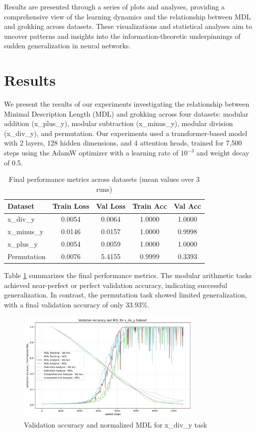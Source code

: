 \documentclass{article} %
\begin{document}
Results are presented through a series of plots and analyses, providing a comprehensive view of the learning dynamics and the relationship between MDL and grokking across datasets. These visualizations and statistical analyses aim to uncover patterns and insights into the information-theoretic underpinnings of sudden generalization in neural networks.

\section{Results}
\label{sec:results}

We present the results of our experiments investigating the relationship between Minimal Description Length (MDL) and grokking across four datasets: modular addition (x\_plus\_y), modular subtraction (x\_minus\_y), modular division (x\_div\_y), and permutation. Our experiments used a transformer-based model with 2 layers, 128 hidden dimensions, and 4 attention heads, trained for 7,500 steps using the AdamW optimizer \cite{loshchilov2017adamw} with a learning rate of $10^{-3}$ and weight decay of 0.5.

\begin{table}[h]
\centering
\caption{Final performance metrics across datasets (mean values over 3 runs)}
\label{tab:final_performance}
\begin{tabular}{lcccc}
\toprule
Dataset & Train Loss & Val Loss & Train Acc & Val Acc \\
\midrule
x\_div\_y & 0.0054 & 0.0064 & 1.0000 & 1.0000 \\
x\_minus\_y & 0.0146 & 0.0157 & 1.0000 & 0.9998 \\
x\_plus\_y & 0.0054 & 0.0059 & 1.0000 & 1.0000 \\
Permutation & 0.0076 & 5.4155 & 0.9999 & 0.3393 \\
\bottomrule
\end{tabular}
\end{table}

Table \ref{tab:final_performance} summarizes the final performance metrics. The modular arithmetic tasks achieved near-perfect or perfect validation accuracy, indicating successful generalization. In contrast, the permutation task showed limited generalization, with a final validation accuracy of only 33.93\%.

\begin{figure}[h]
\centering
\includegraphics[width=0.8\textwidth]{val_acc_mdl_x_div_y.png}
\caption{Validation accuracy and normalized MDL for x\_div\_y task}
\label{fig:val_acc_mdl_x_div_y}
\end{figure}
\end{document}
